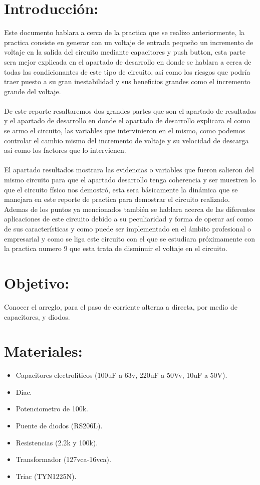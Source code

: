 \documentclass[12pt,letterpaper]{article}
\begin{document}
\newpage


\section{Introducción:}

Este documento hablara a cerca de la practica que se realizo anteriormente, la practica consiste en generar  con un voltaje de entrada pequeño un incremento de voltaje en la salida del circuito mediante capacitores y push button, esta parte sera mejor explicada en el apartado de desarrollo en donde se hablara a cerca de todas las condicionantes de este tipo de circuito, así como los riesgos que podría traer puesto a su gran inestabilidad y sus beneficios grandes como el incremento grande del voltaje.\\
\\De este reporte resaltaremos dos grandes partes que son el apartado de resultados y el apartado de desarrollo en donde el apartado de desarrollo explicara el como se armo el circuito, las variables que intervinieron en el mismo, como podemos controlar el cambio mismo del incremento de voltaje y su velocidad de descarga así como los factores que lo intervienen.\\
\\
El apartado resultados mostrara las evidencias o variables que fueron salieron del mismo circuito para que el apartado desarrollo tenga coherencia y ser muestren lo que el circuito físico nos demostró, esta sera básicamente la dinámica que se manejara en este reporte de practica para demostrar el circuito realizado. \\

Ademas de los puntos ya mencionados también se hablara acerca de las diferentes aplicaciones de este circuito debido a su peculiaridad y forma de operar así como de sus características y como puede ser implementado en el ámbito profesional o empresarial y como se liga este circuito con el que se estudiara próximamente con la practica numero 9 que esta trata  de disminuir el voltaje en el circuito.


\section{Objetivo:}
Conocer el arreglo, para el paso de corriente alterna a directa, por medio de capacitores, y diodos.\\ 

\section{Materiales:}
\begin{itemize}
\item Capacitores electroliticos (100uF a 63v, 220uF a 50Vv, 10uF a 50V).
\item Diac.
\item Potenciometro de 100k.
\item Puente de diodos (RS206L).
\item Resistencias (2.2k y 100k).
\item Transformador (127vca-16vca).
\item Triac (TYN1225N).
\end{itemize}
\newpage
\end{document}
